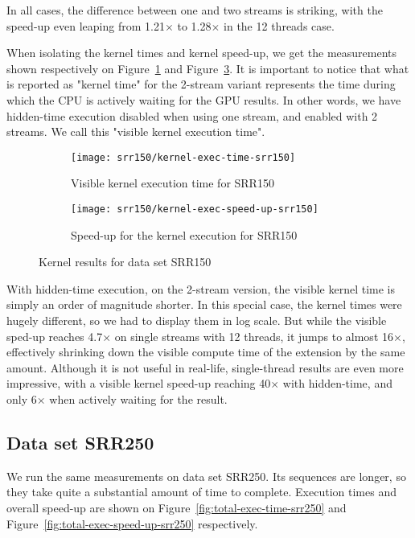 In all cases, the difference between one and two streams is striking, with the speed-up even leaping from 1.21$\times$ to 1.28$\times$ in the 12 threads case.

When isolating the kernel times and kernel speed-up, we get the measurements shown respectively on Figure~\ref{fig:kernel-exec-time-srr150} and Figure~\ref{fig:kernel-exec-speed-up-srr150}. It is important to notice that what is reported as "kernel time" for the 2-stream variant represents the time during which the CPU is actively waiting for the GPU results. In other words, we have hidden-time execution disabled when using one stream, and enabled with 2 streams. We call this "visible kernel execution time".


\begin{figure}[p]
	\centering
	\begin{subfigure}[t]{1\textwidth}
		\centering
		\texttt{[image: srr150/kernel-exec-time-srr150]}
		\caption{Visible kernel execution time for SRR150}
		\label{fig:kernel-exec-time-srr150}
	\end{subfigure}%
	
	\begin{subfigure}[b]{1\textwidth}
		\centering
		\texttt{[image: srr150/kernel-exec-speed-up-srr150]}
		\caption{Speed-up for the kernel execution for SRR150}
		\label{fig:kernel-exec-speed-up-srr150}
	\end{subfigure}
	\caption{Kernel results for data set SRR150}
\end{figure}

With hidden-time execution, on the 2-stream version, the visible kernel time is simply an order of magnitude shorter. In this special case, the kernel times were hugely different, so we had to display them in log scale. But while the visible sped-up reaches 4.7$\times$ on single streams with 12 threads, it jumps to almost 16$\times$, effectively shrinking down the visible compute time of the extension by the same amount. Although it is not useful in real-life, single-thread results are even more impressive, with a visible kernel speed-up reaching 40$\times$ with hidden-time, and only 6$\times$ when actively waiting for the result.


\subsection{Data set SRR250}

We run the same measurements on data set SRR250. Its sequences are longer, so they take quite a substantial amount of time to complete. Execution times and overall speed-up are shown on Figure~\ref{fig:total-exec-time-srr250} and Figure~\ref{fig:total-exec-speed-up-srr250} respectively.



